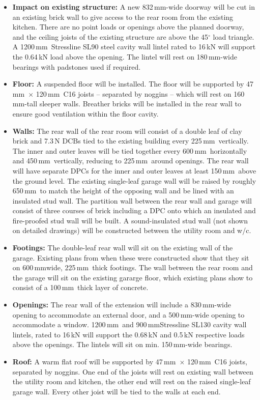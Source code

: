 \documentclass{extension}
\newcommand{\mm}{\,$\mathrm{mm}$}
\begin{document}
\begin{itemize}
  \item {\bf Impact on existing structure:} A new 832\mm -wide doorway will be cut in an existing brick wall to give access to the rear room from the existing kitchen. There are no point loads or openings above the planned doorway, and the ceiling joists of the existing structure are above the 45$^\circ$ load triangle. A 1200\mm\ Stressline SL90 steel cavity wall lintel rated to 16\,kN will support the 0.64\,kN load above the opening.\cite{esteel} The lintel will rest on 180\mm -wide bearings with padstones used if required.
  \item {\bf Floor:} A suspended floor will be installed. The floor will be supported by 47\mm\ $\times$ 120\mm\ C16 joists -- separated by noggins -- which will rest on 160\mm -tall sleeper walls. Breather bricks will be installed in the rear wall to ensure good ventilation within the floor cavity.
  \item {\bf Walls:} The rear wall of the rear room will consist of a double leaf of clay brick and 7.3\,N DCBs tied to the existing building every 225\mm\ vertically. The inner and outer leaves will be tied together every 600\mm\ horizontally and 450\mm\ vertically, reducing to 225\mm\ around openings. The rear wall will have separate DPCs for the inner and outer leaves at least 150\mm\ above the ground level. The existing single-leaf garage wall will be raised by roughly 650\mm\ to match the height of the opposing wall and be lined with an insulated stud wall. The partition wall between the rear wall and garage will consist of three courses of brick including a DPC onto which an insulated and fire-proofed stud wall will be built. A sound-insulated stud wall (not shown on detailed drawings) will be constructed between the utility room and w/c.
  \item {\bf Footings:} The double-leaf rear wall will sit on the existing wall of the garage. Existing plans from when these were constructed show that they sit on 600\mm wide, 225\mm\ thick footings. The wall between the rear room and the garage will sit on the existing gararge floor, which existing plans show to consist of a 100\mm\ thick layer of concrete.
  \item {\bf Openings:} The rear wall of the extension will include a 830\mm -wide opening to accommodate an external door, and a 500\mm -wide opening to accommodate a window. 1200\mm\ and 900\mm Stressline SL130 cavity wall lintels\cite{esteel}, rated to 16\,kN will support the 0.68\,kN and 0.5\,kN respective loads above the openings. The lintels will sit on min. 150\mm -wide bearings.
  \item {\bf Roof:} A warm flat roof will be supported by 47\mm\ $\times$ 120\mm\ C16 joists, separated by noggins. One end of the joists will rest on existing wall between the utility room and kitchen, the other end will rest on the raised single-leaf garage wall. Every other joist will be tied to the walls at each end.
\end{itemize}
\end{document}
